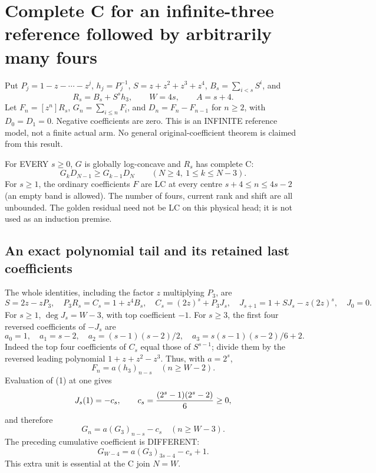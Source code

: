 \section{Complete C for an infinite-three reference followed by arbitrarily many fours}
Put $P_j=1-z-\cdots-z^j$, $h_j=P_j^{-1}$,
$S=z+z^2+z^3+z^4$, $B_s=\sum_{i<s}S^i$, and
\[
 R_s=B_s+S^s h_3,\qquad W=4s,\qquad A=s+4.
\]
Let $F_n=[z^n]R_s$, $G_n=\sum_{i\le n}F_i$, and
$D_n=F_n-F_{n-1}$ for $n\ge2$, with $D_0=D_1=0$.
Negative coefficients are zero. This is an INFINITE reference model,
not a finite actual arm. No general original-coefficient theorem is
claimed from this result.

\begin{theorem}
For EVERY $s\ge0$, $G$ is globally log-concave and $R_s$ has complete C:
\[
 G_kD_{N-1}\ge G_{k-1}D_N\qquad(N\ge4,\ 1\le k\le N-3).
\]
For $s\ge1$, the ordinary coefficients $F$ are LC at every centre
$s+4\le n\le4s-2$ (an empty band is allowed).
The number of fours, current rank and shift are all unbounded.
The golden residual need not be LC on this physical head; it is not
used as an induction premise.
\end{theorem}

\subsection{An exact polynomial tail and its retained last coefficients}
The whole identities, including the factor $z$ multiplying $P_3$, are
\[
 S=2z-zP_3,\quad P_3R_s=C_s=1+z^4B_s,
 \quad C_s=(2z)^s+P_3J_s,
 \quad J_{s+1}=1+SJ_s-z(2z)^s,
 \quad J_0=0.                                             \tag{1}
\]
For $s\ge1$, $\deg J_s=W-3$, with top coefficient $-1$.
For $s\ge3$, the first four reversed coefficients of $-J_s$ are
\[
 a_0=1,\quad a_1=s-2,\quad
 a_2=(s-1)(s-2)/2,\quad a_3=s(s-1)(s-2)/6+2.               \tag{2}
\]
Indeed the top four coefficients of $C_s$ equal those of $S^{s-1}$;
divide them by the reversed leading polynomial $1+z+z^2-z^3$.
Thus, with $a=2^s$,
\[
 F_n=a(h_3)_{n-s}\quad(n\ge W-2).                         \tag{3}
\]
Evaluation of (1) at one gives
\[
 J_s(1)=-c_s,\qquad c_s={(2^s-1)(2^s-2)\over6}\ge0,
\]
and therefore
\[
 G_n=a(G_3)_{n-s}-c_s\quad(n\ge W-3).                     \tag{4}
\]
The preceding cumulative coefficient is DIFFERENT:
\[
 G_{W-4}=a(G_3)_{3s-4}-c_s+1.                             \tag{5}
\]
This extra unit is essential at the C join $N=W$.

